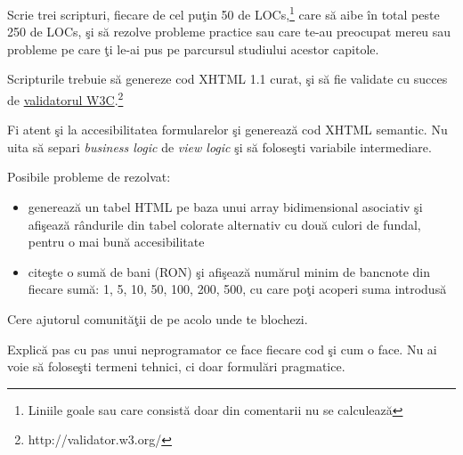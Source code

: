 \begin{Exercise}[title={Scrie scripturi}]

\ExePart

Scrie trei scripturi, fiecare de cel puţin 50 de
LOCs,\footnote{Liniile goale sau care consistă doar din comentarii nu se calculează}
care să aibe în total peste 250 de LOCs, şi să rezolve probleme practice sau care
te-au preocupat mereu sau probleme pe care ţi le-ai pus pe parcursul studiului acestor
capitole.

Scripturile trebuie să genereze cod XHTML 1.1 curat, şi să fie
validate cu succes de \href{http://validator.w3.org/}{validatorul W3C}.\footnote{http://validator.w3.org/}

Fi atent şi la accesibilitatea formularelor şi generează cod XHTML semantic. Nu uita
să separi \textit{business logic} de
\textit{view logic} şi să foloseşti variabile intermediare.

Posibile probleme de rezolvat:
\begin{itemize}
  \item generează un tabel HTML pe baza unui array bidimensional asociativ şi afişează
rândurile din tabel colorate alternativ cu două culori de fundal, pentru o mai bună accesibilitate
  \item citeşte o sumă de bani (RON) şi afişează numărul minim de bancnote din
fiecare sumă: 1, 5, 10, 50, 100, 200, 500, cu care poţi acoperi suma introdusă
\end{itemize}

Cere ajutorul comunităţii de pe {\phpro} acolo unde te blochezi.

\ExePart

Explică pas cu pas unui neprogramator ce face fiecare cod şi cum o face.
Nu ai voie să foloseşti termeni tehnici, ci doar formulări pragmatice.

\end{Exercise}